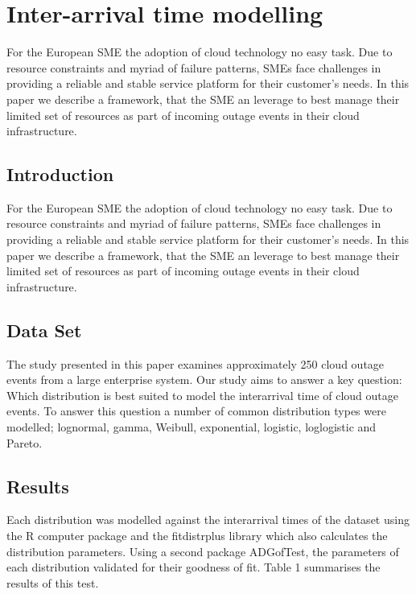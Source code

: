 \section{Inter-arrival time modelling}
For the European SME the adoption of cloud technology no easy task. Due to resource constraints and myriad of failure patterns, SMEs face challenges in providing a reliable and stable service platform for their customer's needs. In this paper we describe a framework, that the SME an leverage to best manage their limited set of resources as part of incoming outage events in their cloud infrastructure. 

\subsection{Introduction}
For the European SME the adoption of cloud technology no easy task. Due to resource constraints and myriad of failure patterns, SMEs face challenges in providing a reliable and stable service platform for their customer's needs. In this paper we describe a framework, that the SME an leverage to best manage their limited set of resources as part of incoming outage events in their cloud infrastructure. 

\subsection{Data Set}
The study presented in this paper examines approximately 250 cloud outage events from a large enterprise system. Our study aims to answer a key question: Which distribution is best suited to model the interarrival time of cloud outage events. To answer this question a number of common distribution types were modelled; lognormal, gamma, Weibull, exponential, logistic, loglogistic and Pareto.
\par

\subsection{Results}
Each distribution was modelled against the interarrival times of the dataset using the R computer package and the fitdistrplus library which also calculates the distribution parameters. Using a second package ADGofTest, the parameters of each distribution validated for their goodness of fit. Table 1 summarises the results of this test.

